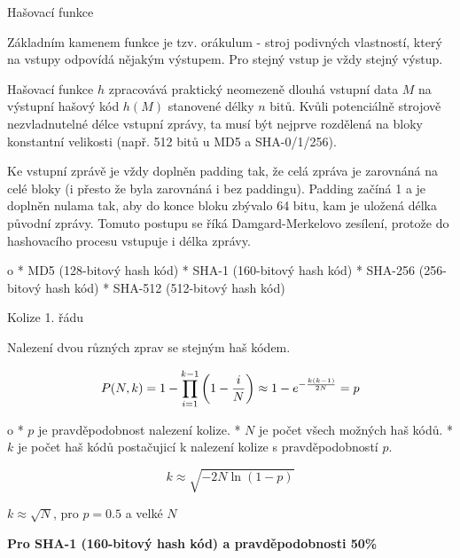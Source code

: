 \chap Hašovací funkce

Základním kamenem funkce je tzv. orákulum - stroj podivných vlastností, který na vstupy odpovídá nějakým výstupem. Pro stejný vstup je vždy stejný výstup.

Hašovací funkce $h$ zpracovává praktický neomezeně dlouhá vstupní data $M$ na výstupní hašový kód $h(M)$ stanovené délky $n$ bitů.
Kvůli potenciálně strojově nezvladnutelné délce vstupní zprávy, ta musí být nejprve rozdělená na bloky konstantní velikosti (např. 512 bitů u MD5 a SHA-0/1/256).

Ke vstupní zprávě je vždy doplněn padding tak, že celá zpráva je zarovnáná na celé bloky (i přesto že byla zarovnáná i bez paddingu). Padding začíná 1 a je doplněn nulama tak, aby do konce bloku zbývalo 64 bitu, kam je uložená délka původní zprávy.
Tomuto postupu se říká Damgard-Merkelovo zesílení, protože do hashovacího procesu vstupuje i délka zprávy.

\begitems \style o
* MD5 (128-bitový hash kód)
* SHA-1 (160-bitový hash kód)
* SHA-256 (256-bitový hash kód)
* SHA-512 (512-bitový hash kód)
\enditems



\sec Kolize 1. řádu

Nalezení dvou různých zprav se stejným haš kódem.

$$
P(N,k) = 1 - \prod^{k-1}_{i=1}\left( 1 - {i \over N} \right)
\approx 1 - e^{-{k(k-1) \over 2N}}= p
$$

\begitems \style o
* $p$ je pravděpodobnost nalezení kolize.
* $N$ je počet všech možných haš kódů.
* $k$ je počet haš kódů postačujicí k nalezení kolize s pravděpodobností $p$.
\enditems

$$k \approx \sqrt{-2N\ln(1 - p)}$$
\centerline
{$k \approx \sqrt{N}$, pro $p = 0.5$ a velké $N$}

\bigskip\centerline
{\bf Pro SHA-1 (160-bitový hash kód) a pravděpodobnosti 50\%}

